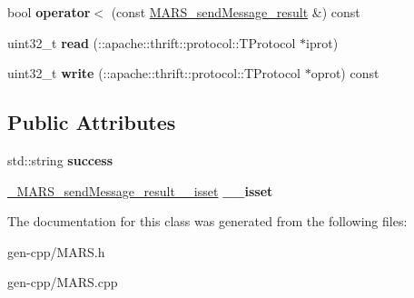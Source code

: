 \begin{DoxyCompactItemize}
\mbox{\label{classMARS_1_1MARS__sendMessage__result_aca8420ed8d3017f88f0d7f38b9076201}} 
bool {\bfseries operator$<$} (const \hyperlink{classMARS_1_1MARS__sendMessage__result}{M\+A\+R\+S\+\_\+send\+Message\+\_\+result} \&) const
\item 
\mbox{\label{classMARS_1_1MARS__sendMessage__result_a5e642e13f3f4883bc4434b9c9adb2fd4}} 
uint32\+\_\+t {\bfseries read} (\+::apache\+::thrift\+::protocol\+::\+T\+Protocol $\ast$iprot)
\item 
\mbox{\label{classMARS_1_1MARS__sendMessage__result_a8ffaacaf086538eed79acae313fed780}} 
uint32\+\_\+t {\bfseries write} (\+::apache\+::thrift\+::protocol\+::\+T\+Protocol $\ast$oprot) const
\end{DoxyCompactItemize}
\subsection*{Public Attributes}
\begin{DoxyCompactItemize}
\item 
\mbox{\label{classMARS_1_1MARS__sendMessage__result_ae15cc9ff56d8a99c046d3c3f07c3a964}} 
std\+::string {\bfseries success}
\item 
\mbox{\label{classMARS_1_1MARS__sendMessage__result_abf49186a02958637a06753a92777df68}} 
\hyperlink{structMARS_1_1__MARS__sendMessage__result____isset}{\+\_\+\+M\+A\+R\+S\+\_\+send\+Message\+\_\+result\+\_\+\+\_\+isset} {\bfseries \+\_\+\+\_\+isset}
\end{DoxyCompactItemize}


The documentation for this class was generated from the following files\+:\begin{DoxyCompactItemize}
\item 
gen-\/cpp/M\+A\+R\+S.\+h\item 
gen-\/cpp/M\+A\+R\+S.\+cpp\end{DoxyCompactItemize}
